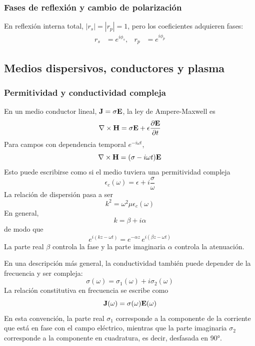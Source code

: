 \documentclass[]{article}
\numberwithin{equation}{section}
\begin{document}
\subsubsection{Fases de reflexión y cambio de polarización}
En reflexión interna total, $|r_s| = |r_p| = 1$, pero los coeficientes adquieren fases:
\begin{align}
	r_s &= e^{i\phi_s}, & r_p &= e^{i\phi_p}
\end{align}

\subsection{Medios dispersivos, conductores y plasma}

\subsubsection{Permitividad y conductividad compleja}
En un medio conductor lineal, $\mathbf{J}=\sigma\mathbf{E}$, la ley de Ampere-Maxwell es
\begin{equation*}
	\nabla\times\mathbf{H} = \sigma\mathbf{E} + \epsilon\dfrac{\partial \mathbf{E}}{\partial t}
\end{equation*}
Para campos con dependencia temporal $e^{-i \omega t}$,
\begin{equation}
	\nabla\times\mathbf{H} = (\sigma - i \omega t) \mathbf{E}
\end{equation}
Esto puede escribirse como si el medio tuviera una permitividad compleja
\begin{equation}
	\epsilon_c(\omega) = \epsilon + i\frac{\sigma}{\omega}
\end{equation}
La relación de dispersión pasa a ser
\begin{equation}
	k^2 = \omega^2 \mu \epsilon_c(\omega)
\end{equation}
En general,
\begin{equation}
	k = \beta + i \alpha
\end{equation}
de modo que
\begin{equation}
	e^{i(kz - \omega t)} = e^{-\alpha z} \, e^{i(\beta z - \omega t)}
\end{equation}
La parte real $\beta$ controla la fase y la parte imaginaria $\alpha$ controla la atenuación.

En una descripción más general, la conductividad también puede depender de la frecuencia y ser compleja:
\begin{equation}
	\sigma(\omega) = \sigma_1(\omega) + i\sigma_2(\omega)
\end{equation}
La relación constitutiva en frecuencia se escribe como
\begin{equation}
	\mathbf{J}(\omega) = \sigma(\omega) \mathbf{E}(\omega)
\end{equation}
En esta convención, la parte real $\sigma_1$ corresponde a la componente de la corriente que está en fase con el campo eléctrico, mientras que la parte imaginaria $\sigma_2$ corresponde a la componente en cuadratura, es decir, desfasada en 90°.
\end{document}
